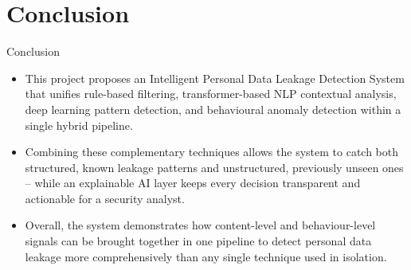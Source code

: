 \documentclass{beamer}
\begin{document}
\section{Conclusion}
\begin{frame}{Conclusion}
\begin{itemize}
  \justifying
  \item This project proposes an Intelligent Personal Data Leakage Detection System that unifies rule-based filtering, transformer-based NLP contextual analysis, deep learning pattern detection, and behavioural anomaly detection within a single hybrid pipeline.
  \item Combining these complementary techniques allows the system to catch both structured, known leakage patterns and unstructured, previously unseen ones – while an explainable AI layer keeps every decision transparent and actionable for a security analyst.
  \item Overall, the system demonstrates how content-level and behaviour-level signals can be brought together in one pipeline to detect personal data leakage more comprehensively than any single technique used in isolation.
\end{itemize}
\end{frame}
\end{document}
